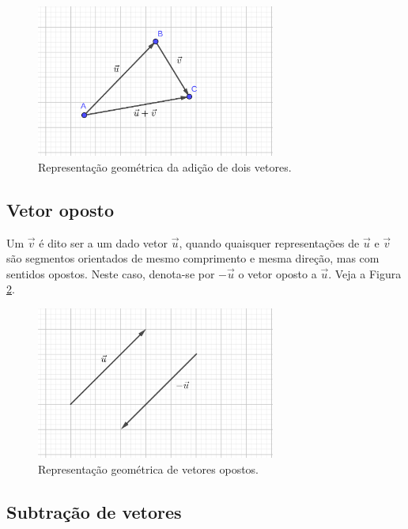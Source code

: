 \begin{figure}[h!]
  \centering
  \includegraphics[width=0.7\textwidth]{./cap_vetor/dados/fig_vadicao/fig_vadicao}
  \caption{Representação geométrica da adição de dois vetores.}
  \label{fig:vadicao}
\end{figure}

\subsection{Vetor oposto}

Um  $\vec{v}$ é dito ser   a um dado vetor $\vec{u}$, quando quaisquer representações de $\vec{u}$ e $\vec{v}$ são segmentos orientados de mesmo comprimento e mesma direção, mas com sentidos opostos. Neste caso, denota-se por $-\vec{u}$ o vetor oposto a $\vec{u}$. Veja a Figura \ref{fig:voposto}.

\begin{figure}[h!]
  \centering
  \includegraphics[width=0.7\textwidth]{./cap_vetor/dados/fig_voposto/fig_voposto}
  \caption{Representação geométrica de vetores opostos.}
  \label{fig:voposto}
\end{figure}

\subsection{Subtração de vetores}

